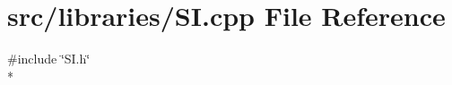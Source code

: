 \section{src/libraries/\-S\-I.cpp File Reference}
\label{_s_i_8cpp}
{\ttfamily \#include \char`\"{}S\-I.\-h\char`\"{}}\\*
